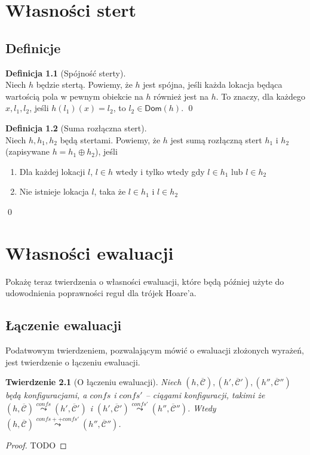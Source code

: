 \documentclass[]{pracamgr}
\renewcommand \| {\hspace{0.75em} | \hspace{0.75em} }
\renewcommand \[ {[\![}
\renewcommand \] {]\!]}
\newcommand \eval [1] {\overset{#1}{\leadsto}}
\newtheorem{theorem}{Twierdzenie}
\theoremstyle{definition}
\newtheorem{definition}{Definicja}[section]
\newcommand{\ctxt}{\mathcal{C}\xspace}
\newcommand{\ctxts}{\overline{\ctxt}}
\newcommand{\dom}[1]{\mathsf{Dom}(#1)\xspace}
\begin{document}
\chapter{Własności stert}

\section{Definicje}
\begin{definition}[Spójność sterty]{\ } \\
Niech $h$ będzie stertą.
Powiemy, że $h$ jest spójna, jeśli każda lokacja będąca wartością pola w pewnym obiekcie na $h$
również jest na $h$.
To znaczy, dla każdego $x, l_1, l_2$, jeśli $h(l_1)(x) = l_2$, to $l_2 \in \dom{h}$.
\qed
\end{definition}

\begin{definition}[Suma rozłączna stert]{\ } \\
Niech $h, h_1, h_2$ będą stertami.
Powiemy, że $h$ jest sumą rozłączną stert $h_1$ i $h_2$ (zapisywane $h = h_1 \oplus h_2$),
jeśli
\begin{enumerate}
 \item Dla każdej lokacji $l$, $l \in h$ wtedy i tylko wtedy gdy $l \in h_1$ lub $l \in h_2$
 \item Nie istnieje lokacja $l$, taka że $l \in h_1$ i $l \in h_2$
\end{enumerate}

\qed
\end{definition}


\chapter{Własności ewaluacji}
Pokażę teraz twierdzenia o własności ewaluacji, które będą później użyte do udowodnienia poprawności reguł dla trójek Hoare'a.
\section{Łączenie ewaluacji}
Podatwowym twierdzeniem, pozwalającym mówić o ewaluacji złożonych wyrażeń, jest twierdzenie o łączeniu ewaluacji.
\begin{theorem}[O łączeniu ewaluacji]
\label{th:eval_join}
Niech $(h, \ctxts), (h', \ctxts'), (h'', \ctxts'')$ będą konfiguracjami, a $confs$ i $confs'$ -- ciągami konfiguracji,
takimi że $(h, \ctxts) \eval{confs} (h', \ctxts')$ i $(h', \ctxts') \eval{confs'} (h'', \ctxts'')$.
Wtedy $(h, \ctxts) \eval{confs ++ confs'} (h'', \ctxts'')$.
\end{theorem}
\begin{proof}
TODO
\end{proof}
\end{document}

